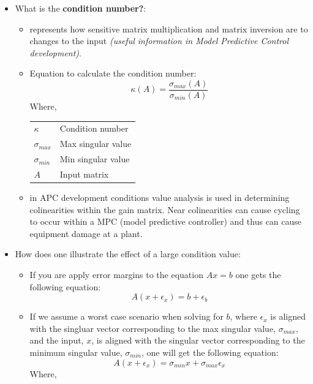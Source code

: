 \documentclass[11.5pt,a4paper]{article}
\makeatletter
\newenvironment{conditions}
  {\par\vspace{\abovedisplayskip}\noindent\begin{tabular}{>{$}l<{$} @{${}={}$} l}}
  {\end{tabular}\par\vspace{\belowdisplayskip}}
\makeatother
\begin{document}
\begin{itemize}
    \item What is the \textbf{condition number?}:
    \begin{itemize}
        \item represents how sensitive matrix multiplication and matrix inversion are to changes to the input \textit{(useful information in Model Predictive Control development)}.
        \item Equation to calculate the condition number:
        \begin{equation*}
            \kappa(A) = \frac{\sigma_{max}(A)}{\sigma_{min}(A)}
        \end{equation*}
        Where,
        \begin{conditions}
            \kappa & Condition number \\
            \sigma_{max} & Max singular value \\
            \sigma_{min} & Min singular value \\
            A & Input matrix
        \end{conditions}
        \item in APC development conditions value analysis is used in determining colinearities within the gain matrix. Near colinearities can cause cycling to occur within a MPC (model predictive controller) and thus can cause equipment damage at a plant.
    \end{itemize}
    \item How does one illustrate the effect of a large condition value:
    \begin{itemize}
        \item If you are apply error margins to the equation $Ax = b$ one gets the following equation:
        \begin{equation*}
            A(x + \epsilon_x) = b + \epsilon_b
        \end{equation*}
        \item If we assume a worst case scenario when solving for $b$, where $\epsilon_x$ is aligned with the singluar vector corresponding to the max singular value, $\sigma_{max}$, and the input, $x$, is aligned with the singular vector corresponding to the minimum singular value, $\sigma_{min}$, one will get the following equation:
        \begin{equation*}
            A(x + \epsilon_x) = \sigma_{min}x + \sigma_{max}\epsilon_x
        \end{equation*}
        Where,
        \begin{conditions}

\end{conditions}
\end{itemize}
\end{itemize}
\end{document}
